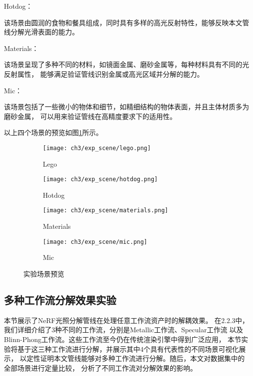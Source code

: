  Hotdog：

该场景由圆润的食物和餐具组成，同时具有多样的高光反射特性，能够反映本文管线分解光滑表面的能力。

 Materials：

该场景呈现了多种不同的材料，如镜面金属、磨砂金属等，每种材料具有不同的光反射属性，
能够满足验证管线识别金属或高光区域并分解的能力。

 Mic：

该场景包括了一些微小的物体和细节，如精细结构的物体表面，并且主体材质多为磨砂金属，
可以用来验证管线在高精度要求下的适用性。

以上四个场景的预览如图\ref{fig:exp_scene}所示。

\begin{figure}[H]
  \centering
  \begin{subfigure}[t]{0.24\textwidth}
    \centering
    \texttt{[image: ch3/exp\_scene/lego.png]}
    \caption{Lego}
  \end{subfigure}
  \begin{subfigure}[t]{0.24\textwidth}
    \centering
    \texttt{[image: ch3/exp\_scene/hotdog.png]}
    \caption{Hotdog}
  \end{subfigure}
  \begin{subfigure}[t]{0.24\textwidth}
    \centering
    \texttt{[image: ch3/exp\_scene/materials.png]}
    \caption{Materials}
  \end{subfigure}
  \begin{subfigure}[t]{0.24\textwidth}
    \centering
    \texttt{[image: ch3/exp\_scene/mic.png]}
    \caption{Mic}
  \end{subfigure}
  \caption{实验场景预览}
  \label{fig:exp_scene}
\end{figure}

\subsection{多种工作流分解效果实验}
本节展示了NeRF光照分解管线在处理任意工作流资产时的解耦效果。
在2.2.3中，我们详细介绍了3种不同的工作流，分别是Metallic工作流、Specular工作流
以及Blinn-Phong工作流。这些工作流至今仍在传统渲染引擎中得到广泛应用，
本节实验将基于这三种工作流进行分解，并展示其中4个具有代表性的不同场景可视化展示，
以定性证明本文管线能够对多种工作流进行分解。随后，本文对数据集中的全部场景进行定量比较，
分析了不同工作流对分解效果的影响。

